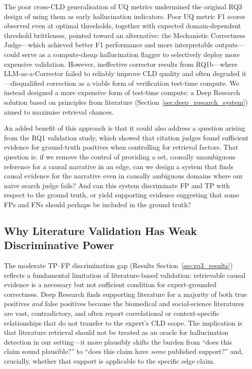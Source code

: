 The poor cross-CLD generalisation of UQ metrics undermined the original RQ3 design of using them as early hallucination indicators. Poor UQ metric F1 scores observed even at optimal thresholds, together with expected domain-dependent threshold brittleness, pointed toward an alternative: the Mechanistic Correctness Judge---which achieved better F1 performance and more interpretable outputs---could serve as a compute-cheap hallucination flagger to selectively deploy more expensive validation. However, ineffective corrector results from RQ1b---where LLM-as-a-Corrector failed to reliably improve CLD quality and often degraded it---disqualified correction as a viable form of verification test-time compute. We instead designed a more expensive form of test-time compute: a Deep Research solution based on principles from literature (Section~\ref{sec:deep_research_system}) aimed to maximise retrieval chances.

An added benefit of this approach is that it could also address a question arising from the RQ1 validation study, which showed that citation judges found sufficient evidence for ground-truth positives when controlling for retrieval factors. That question is: if we remove the control of providing a set, causally unambiguous reference for a causal narrative in an edge, can we design a system that finds causal evidence for the narrative even in causally ambiguous domains where our naive search judge fails? And can this system discriminate FP and TP with respect to the ground truth, or yield supporting evidence suggesting that some FPs and FNs should perhaps be included in the ground truth?

\subsection{Why Literature Validation Has Weak Discriminative Power}

The moderate TP--FP discrimination gap (Results Section~\ref{sec:rq3_results}) reflects a fundamental limitation of literature-based validation: retrievable causal evidence is a necessary but not sufficient condition for expert-grounded correctness. Deep Research finds supporting literature for a majority of both true positives \emph{and} false positives because the biomedical and social-science literatures are vast, contradictory, and often report correlational or context-specific relationships that do not transfer to the expert's CLD scope. The implication is that literature retrieval should not be treated as an oracle for hallucination detection in our setting---it more plausibly shifts the burden from ``does this claim sound plausible?'' to ``does this claim have \emph{some} published support?'' and, crucially, whether that support is applicable to the specific edge claim.

